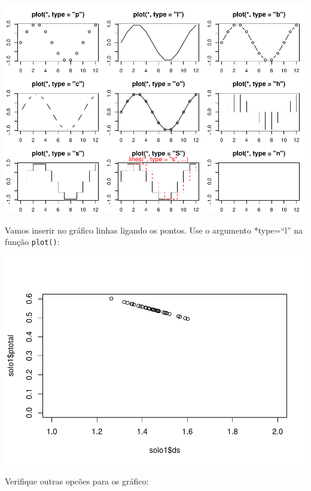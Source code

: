 \documentclass[
]{book}
\newenvironment{Shaded}{\begin{snugshade}}{\end{snugshade}}
\newcommand{\DataTypeTok}[1]{\textcolor[rgb]{0.13,0.29,0.53}{#1}}
\newcommand{\KeywordTok}[1]{\textcolor[rgb]{0.13,0.29,0.53}{\textbf{#1}}}
\newcommand{\NormalTok}[1]{#1}
\newcommand{\OperatorTok}[1]{\textcolor[rgb]{0.81,0.36,0.00}{\textbf{#1}}}
\newcommand{\StringTok}[1]{\textcolor[rgb]{0.31,0.60,0.02}{#1}}
\begin{document}
\includegraphics{TudodoR_files/figure-latex/unnamed-chunk-154-1.pdf}

Vamos inserir no gráfico linhas ligando os pontos. Use o argumento *type=``l'' na função \texttt{plot()}:

\begin{Shaded}
\end{Shaded}

\includegraphics{TudodoR_files/figure-latex/unnamed-chunk-155-1.pdf}

Verifique outras opcões para os gráfico:
\end{document}
